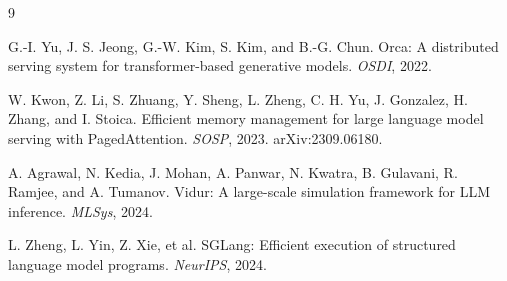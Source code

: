 \documentclass[11pt]{article}
\begin{document}
\begin{thebibliography}{9}

 G.-I. Yu, J. S. Jeong, G.-W. Kim, S. Kim, and B.-G. Chun. Orca: A distributed serving system for transformer-based generative models. \emph{OSDI}, 2022.

 W. Kwon, Z. Li, S. Zhuang, Y. Sheng, L. Zheng, C. H. Yu, J. Gonzalez, H. Zhang, and I. Stoica. Efficient memory management for large language model serving with PagedAttention. \emph{SOSP}, 2023. arXiv:2309.06180.

 A. Agrawal, N. Kedia, J. Mohan, A. Panwar, N. Kwatra, B. Gulavani, R. Ramjee, and A. Tumanov. Vidur: A large-scale simulation framework for LLM inference. \emph{MLSys}, 2024.

 L. Zheng, L. Yin, Z. Xie, et al. SGLang: Efficient execution of structured language model programs. \emph{NeurIPS}, 2024.

\end{thebibliography}
\end{document}
